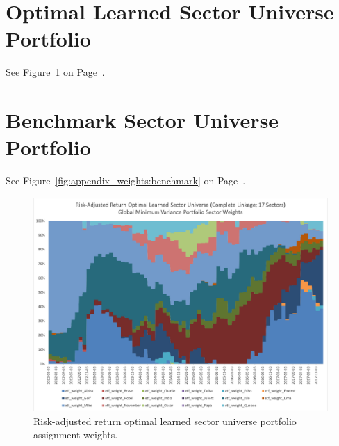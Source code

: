 \documentclass[../main.tex]{subfiles}
\begin{document}
\section*{Optimal Learned Sector Universe Portfolio}

See Figure~\ref{fig:appendix_weights:sharpe_optimal} on Page~\pageref{fig:appendix_weights:sharpe_optimal}.


\section*{Benchmark Sector Universe Portfolio}

See Figure~\ref{fig:appendix_weights:benchmark} on Page~\pageref{fig:appendix_weights:benchmark}.

\newpage
\begin{figure}
    \centering
    \includegraphics[width=\linewidth]{images/complete_17_sector_assignments.png}
    \caption{Risk-adjusted return optimal learned sector universe portfolio assignment weights.}
    \label{fig:appendix_weights:sharpe_optimal}
\end{figure}
\end{document}

